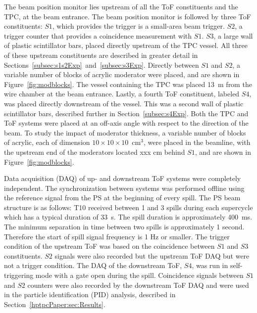 The beam position monitor lies upstream of all the ToF constituents and the TPC, at the beam entrance. 
The beam position monitor is followed by three ToF constituents: $\mathit{S1}$, which provides the trigger is a small-area beam trigger.
$\mathit{S2}$, a trigger counter that provides a coincidence measurement with $\mathit{S1}$.
$\mathit{S3}$, a large wall of plastic scintillator bars, placed directly upstream of the TPC vessel.
All three of these upstream constituents are described in greater detail in Sections~\ref{subsec:s1s2Exp}~and~\ref{subsec:s3Exp}.
Directly between $\mathit{S1}$ and $\mathit{S2}$, a variable number of blocks of acrylic moderator were placed, and are shown in Figure~\ref{fig:modblocks}.
The vessel containing the TPC was placed 13~m from the wire chamber at the beam entrance.
Lastly, a fourth ToF constituent, labeled $\mathit{S4}$, was placed directly downstream of the vessel.
This was a second wall of plastic scintillator bars, described further in Section~\ref{subsec:s4Exp}.
Both the TPC and ToF systems were placed at an off-axis angle with respect to the direction of the beam.
To study the impact of moderator thickness, a variable number of blocks of acrylic, each of dimension $10\times10\times10$~cm$^3$, were placed in the beamline, with the upstream end of the moderators located xxx cm behind $\mathit{S1}$, and are shown in Figure~\ref{fig:modblocks}.


Data acquisition (DAQ) of up- and downstream ToF systems were completely independent.
The synchronization between systems was performed offline using the reference signal from the PS at the beginning of every spill.
The PS beam structure is as follows: T10 received between 1 and 3 spills during each supercycle which has a typical duration of 33~s.
The spill duration is approximately 400~ms.
The minimum separation in time between two spills is approximately 1 second.
Therefore the start of spill signal frequency is 1 Hz or smaller.
The trigger condition of the upstream ToF was based on the coincidence between $\mathit{S1}$ and $\mathit{S3}$ constituents.
$\mathit{S2}$ signals were also recorded but the upstream ToF DAQ but were not a trigger condition.
The DAQ of the downstream ToF, $\mathit{S4}$, was run in self-triggering mode with a gate open during the spill.
Coincidence signals between $\mathit{S1}$ and $\mathit{S2}$ counters were also recorded by the downstream ToF DAQ and were used in the particle identification (PID) analysis, described in Section~\ref{hptpcPaper:sec:Results}.  

